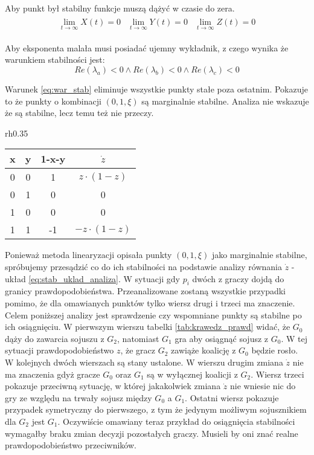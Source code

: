 Aby punkt był stabilny funkcje muszą dążyć w czasie do zera.
\begin{align}
\begin{array}{ccc}
\displaystyle\lim_{t \to \infty} X(t)=0 & \displaystyle\lim_{t \to \infty} Y(t)=0 & \displaystyle\lim_{t \to \infty} Z(t)=0
\end{array}
\end{align}

Aby eksponenta malała musi posiadać ujemny wykładnik, z czego wynika że warunkiem stabilności jest:
\begin{equation}\label{eq:war_stab}
Re(\lambda_a)<0 \wedge Re(\lambda_b)<0 \wedge Re(\lambda_c)<0
\end{equation}

Warunek \ref{eq:war_stab} eliminuje wszystkie punkty stałe poza ostatnim. Pokazuje to że punkty o kombinacji $(0,1,\xi)$ są marginalnie stabilne. Analiza nie wskazuje że są stabilne, lecz temu też nie przeczy.
\begin{wraptable}{rh}{0.35\textwidth}
    \centering
    \caption{Stabilność na krawędzi sześcianu}
\label{tab:krawedz_prawd}
\begin{tabular}{c|c|c|c}
x & y & 1-x-y & $\dot{z}$       \\ \hline 
0 & 0 & 1     & $z \cdot (1-z)$  \\
0 & 1 & 0     & 0                \\
1 & 0 & 0     & 0                \\
1 & 1 & -1    & $-z \cdot (1-z)$
\end{tabular}
\end{wraptable}

Ponieważ metoda linearyzacji opisała punkty $(0,1,\xi)$ jako marginalnie stabilne, spróbujemy przesądzić co do ich stabilności na podstawie analizy równania $\dot{z}$ - układ \ref{eq:stab_uklad_analiza}. W sytuacji gdy $p_i$ dwóch z graczy dojdą do granicy prawdopodobieństwa. Przeanalizowane zostaną wszystkie przypadki pomimo, że dla omawianych punktów tylko wiersz drugi i trzeci ma znaczenie. Celem poniższej analizy jest sprawdzenie czy wspomniane punkty są stabilne po ich osiągnięciu.
W pierwszym wierszu tabelki \ref{tab:krawedz_prawd} widać, że $G_0$ dąży do zawarcia sojuszu z $G_2$, natomiast $G_1$ gra aby osiągnąć sojusz z $G_0$. W tej sytuacji prawdopodobieństwo $z$, że gracz $G_2$ zawiąże koalicję z $G_0$ będzie rosło. W kolejnych dwóch wierszach są stany ustalone. W wierszu drugim zmiana $\dot{z}$ nie ma znaczenia gdyż gracze $G_0$ oraz $G_1$ są w wyłącznej koalicji z $G_2$. Wiersz trzeci pokazuje przeciwną sytuację, w której jakakolwiek zmiana $\dot{z}$ nie wniesie nic do gry ze względu na trwały sojusz między $G_0$ a $G_1$. Ostatni wiersz pokazuje przypadek symetryczny do pierwszego, z tym że jedynym możliwym sojusznikiem dla $G_2$ jest $G_1$. Oczywiście omawiany teraz przykład do osiągnięcia stabilności wymagałby braku zmian decyzji pozostałych graczy. Musieli by oni znać realne prawdopodobieństwo przeciwników.
